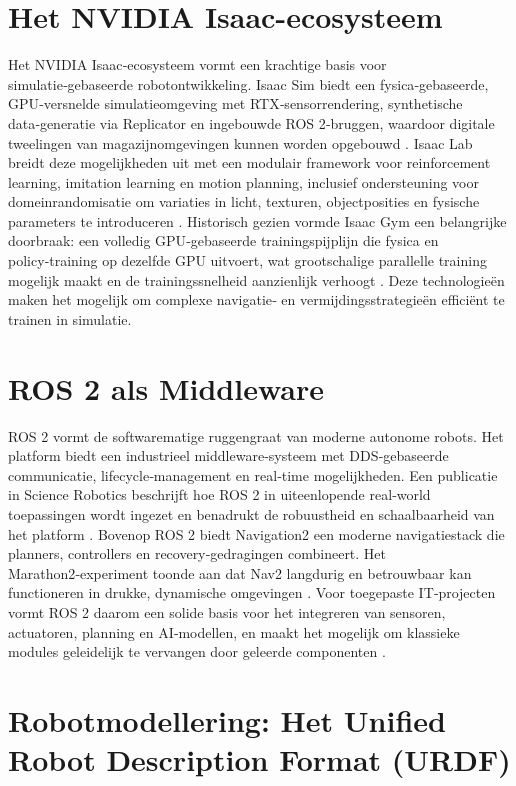 \section{Het NVIDIA Isaac-ecosysteem}
Het NVIDIA Isaac‑ecosysteem vormt een krachtige basis voor simulatie‑gebaseerde robotontwikkeling. Isaac Sim biedt een fysica‑gebaseerde, GPU‑versnelde simulatieomgeving met RTX‑sensorrendering, synthetische data‑generatie via Replicator en ingebouwde ROS 2‑bruggen, waardoor digitale tweelingen van magazijnomgevingen kunnen worden opgebouwd \autocite{NVIDIA2025}. Isaac Lab breidt deze mogelijkheden uit met een modulair framework voor reinforcement learning, imitation learning en motion planning, inclusief ondersteuning voor domeinrandomisatie om variaties in licht, texturen, objectposities en fysische parameters te introduceren \autocite{IsaacLab2025}. Historisch gezien vormde Isaac Gym een belangrijke doorbraak: een volledig GPU‑gebaseerde trainingspijplijn die fysica en policy‑training op dezelfde GPU uitvoert, wat grootschalige parallelle training mogelijk maakt en de trainingssnelheid aanzienlijk verhoogt \autocite{Makoviychuk2021}. Deze technologieën maken het mogelijk om complexe navigatie‑ en vermijdingsstrategieën efficiënt te trainen in simulatie.

\section{ROS 2 als Middleware}
ROS 2 vormt de softwarematige ruggengraat van moderne autonome robots. Het platform biedt een industrieel middleware‑systeem met DDS‑gebaseerde communicatie, lifecycle‑management en real‑time mogelijkheden. Een publicatie in Science Robotics beschrijft hoe ROS 2 in uiteenlopende real‑world toepassingen wordt ingezet en benadrukt de robuustheid en schaalbaarheid van het platform \textcite{Macenski2022}. Bovenop ROS 2 biedt Navigation2 een moderne navigatiestack die planners, controllers en recovery‑gedragingen combineert. Het Marathon2‑experiment toonde aan dat Nav2 langdurig en betrouwbaar kan functioneren in drukke, dynamische omgevingen \textcite{Macenski2020}. Voor toegepaste IT‑projecten vormt ROS 2 daarom een solide basis voor het integreren van sensoren, actuatoren, planning en AI‑modellen, en maakt het mogelijk om klassieke modules geleidelijk te vervangen door geleerde componenten \autocite{OpenNavigation2025}.

\section{Robotmodellering: Het Unified Robot Description Format (URDF)}
\label{sec:urdf_modellering}

